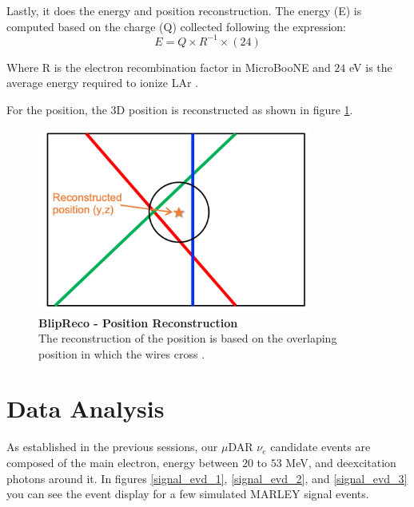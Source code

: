Lastly, it does the energy and position reconstruction. The energy (E) is computed based on the charge (Q) collected following the expression:
\begin{equation}
    E=Q\times R^{-1} \times (24)
\end{equation}

Where R is the electron recombination factor in MicroBooNE and $24$ eV is the average energy required to ionize LAr \cite{lariat_calorimetry_lar}. 

For the position, the 3D position is reconstructed as shown in figure \ref{blip_position}. 

\begin{figure}[h!]
    \centering
    \includegraphics[width=90mm]{Figures/blip_reco_position.png}
    \caption[BlipReco - Position Reconstruction]{{\textbf{BlipReco - Position Reconstruction}}\\ The reconstruction of the position is based on the overlaping position in which the wires cross \cite{will_CM_Aug}.}
    \label{blip_position}
\end{figure}

\newpage
\section{Data Analysis}
As established in the previous sessions, our $\mu$DAR $\nu_e$ candidate events are composed of the main electron, energy between $20$ to $53$ MeV, and deexcitation photons around it. In figures \ref{signal_evd_1}, \ref{signal_evd_2}, and \ref{signal_evd_3} you can see the event display for a few simulated MARLEY signal events. 

